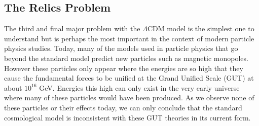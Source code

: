 \documentclass[a4paper,12pt,twoside]{report}
\begin{document}
\noindent%
\begin{minipage}{\linewidth}%
\label{Fig2.2}
\end{minipage}

\subsection{The Relics Problem}\label{subsec:RelicProb}

The third and final major problem with the $\Lambda$CDM model is the simplest one to understand but is perhaps the most important in the context of modern particle physics studies. Today, many of the models used in particle physics that go beyond the standard model predict new particles such as magnetic monopoles. However these particles only appear where the energies are so high that they cause the fundamental forces to be unified at the Grand Unified Scale (GUT) at about $10^{16}$ GeV. Energies this high can only exist in the very early universe where many of these particles would have been produced. As we observe none of these particles or their effects today, we can only conclude that the standard cosmological model is inconsistent with these GUT theories in its current form.
\end{document}
